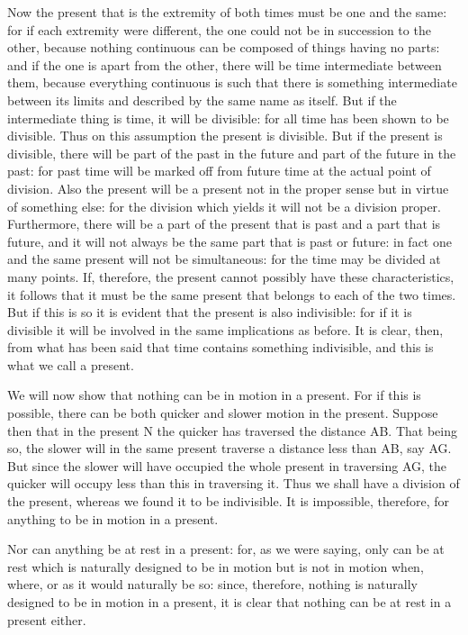 Now the present that is the extremity of both times must be one and
the same: for if each extremity were different, the one could not
be in succession to the other, because nothing continuous can be composed
of things having no parts: and if the one is apart from the other,
there will be time intermediate between them, because everything continuous
is such that there is something intermediate between its limits and
described by the same name as itself. But if the intermediate thing
is time, it will be divisible: for all time has been shown to be divisible.
Thus on this assumption the present is divisible. But if the present
is divisible, there will be part of the past in the future and part
of the future in the past: for past time will be marked off from future
time at the actual point of division. Also the present will be a present
not in the proper sense but in virtue of something else: for the division
which yields it will not be a division proper. Furthermore, there
will be a part of the present that is past and a part that is future,
and it will not always be the same part that is past or future: in
fact one and the same present will not be simultaneous: for the time
may be divided at many points. If, therefore, the present cannot possibly
have these characteristics, it follows that it must be the same present
that belongs to each of the two times. But if this is so it is evident
that the present is also indivisible: for if it is divisible it will
be involved in the same implications as before. It is clear, then,
from what has been said that time contains something indivisible,
and this is what we call a present. 

We will now show that nothing can be in motion in a present. For if
this is possible, there can be both quicker and slower motion in the
present. Suppose then that in the present N the quicker has traversed
the distance AB. That being so, the slower will in the same present
traverse a distance less than AB, say AG. But since the slower will
have occupied the whole present in traversing AG, the quicker will
occupy less than this in traversing it. Thus we shall have a division
of the present, whereas we found it to be indivisible. It is impossible,
therefore, for anything to be in motion in a present. 

Nor can anything be at rest in a present: for, as we were saying,
only can be at rest which is naturally designed to be in motion but
is not in motion when, where, or as it would naturally be so: since,
therefore, nothing is naturally designed to be in motion in a present,
it is clear that nothing can be at rest in a present either.

